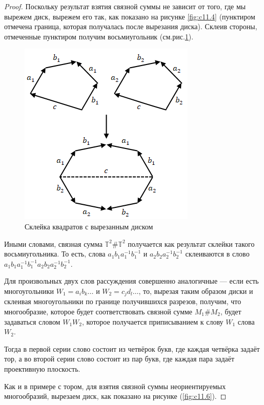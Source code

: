 \begin{proof}
    Поскольку результат взятия связной суммы не зависит от того, где мы вырежем диск, вырежем его так, как показано на рисунке \ref{fig:c11.4} (пунктиром отмечена граница, которая получалась после вырезания диска). Склеив стороны, отмеченные пунктиром получим восьмиугольник (см.рис.\ref{fig:c11.5}).

    \begin{figure}[htbp]
        \centering
        \includegraphics[scale=0.7]{images/c11.5.png}
        \caption{Склейка квадратов с вырезанным диском}
        \label{fig:c11.5}
    \end{figure}

    Иными словами, связная сумма $\mathbb{T}^2 \# \mathbb{T}^2$ получается как результат склейки такого восьмиугольника. То есть, слова $a_1 b_1 a_1^{-1} b_1^{-1}$ и $a_2 b_2 a_2^{-1} b_2^{-1}$ склеиваются в слово $a_1 b_1 a_1^{-1} b_1^{-1} a_2 b_2 a_2^{-1} b_2^{-1}$.

    Для произвольных двух слов рассуждения совершенно аналогичные — если есть многоугольники $W_1 = a_i b_k \dots$ и $W_2 = c_j d_l \dots$, то, вырезая таким образом диски и склеивая многоугольники по границе получившихся разрезов, получим, что многообразие, которое будет соответствовать связной сумме $M_1 \# M_2$, будет задаваться словом $W_1 W_2$, которое получается приписыванием к слову $W_1$ слова $W_2$.

    Тогда в первой серии слово состоит из четвёрок букв, где каждая четвёрка задаёт тор, а во второй серии слово состоит из пар букв, где каждая пара задаёт проективную плоскость.

    Как и в примере с тором, для взятия связной суммы неориентируемых многообразий, вырезаем диск, как показано на рисунке (\ref{fig:c11.6}).


\end{proof}
